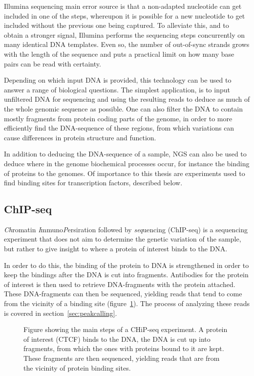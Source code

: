 Illumina sequencing main error source is that a non-adapted nucleotide can get included in one of the steps, whereupon it is possible for a new nucleotide to get included without the previous one being captured.
To alleviate this, and to obtain a stronger signal, Illumina performs the sequencing steps concurrently on many identical DNA templates. Even so, the number of out-of-sync strands grows with the length of the sequence and puts a practical limit on how many base pairs can be read with certainty.

Depending on which input DNA is provided, this technology can be used to answer a range of biological questions.
The simplest application, is to input unfiltered DNA for sequencing and using the resulting reads to deduce as much of the whole genomic sequence as possible. One can also filter the DNA to contain mostly fragments from protein coding parts of the genome, in order to more efficiently find the DNA-sequence of these regions, from which variations can cause differences in protein structure and function.

In addition to deducing the DNA-sequence of a sample, NGS can also be used to deduce where in the genome biochemical processes occur, for instance the binding of proteins to the genomes. Of importance to this thesis are experiments used to find binding sites for transcription factors, described below.

\subsection{ChIP-seq}
\emph{Ch}romatin \emph{I}mmuno\emph{P}ersiration followed by \emph{seq}uencing (ChIP-seq) is a sequencing experiment that does not aim to determine the genetic variation of the sample, but rather to give insight to where a protein of interest binds to the DNA.

In order to do this, the binding of the protein to DNA is strengthened in order to keep the bindings after the DNA is cut into fragments.
Antibodies for the protein of interest is then used to retrieve DNA-fragments with the protein attached.
These DNA-fragments can then be sequenced, yielding reads that tend to come from the vicinity of a binding site (figure~\ref{fig:chipseq}). The process of analyzing these reads is covered in section~\ref{sec:peakcalling}.
\begin{figure}

\caption{
  Figure showing the main steps of a CHiP-seq experiment. A protein of interest (CTCF) binds to the DNA, the DNA is cut up into fragments, from which the ones with proteins bound to it are kept. These fragments are then sequenced, yielding reads that are from the vicinity of protein binding sites.}
\label{fig:chipseq}
\end{figure}
